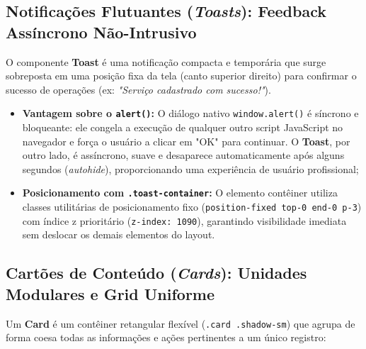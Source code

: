 \subsection{Notificações Flutuantes (\textit{Toasts}): Feedback Assíncrono Não-Intrusivo}
O componente \textbf{Toast} é uma notificação compacta e temporária que surge sobreposta em uma posição fixa da tela (canto superior direito) para confirmar o sucesso de operações (ex: \textit{"Serviço cadastrado com sucesso!"}).
\begin{itemize}
  \item \textbf{Vantagem sobre o \texttt{alert()}:} O diálogo nativo \texttt{window.alert()} é síncrono e bloqueante: ele congela a execução de qualquer outro script JavaScript no navegador e força o usuário a clicar em "OK" para continuar. O \textbf{Toast}, por outro lado, é assíncrono, suave e desaparece automaticamente após alguns segundos (\textit{autohide}), proporcionando uma experiência de usuário profissional;
  \item \textbf{Posicionamento com \texttt{.toast-container}:} O elemento contêiner utiliza classes utilitárias de posicionamento fixo (\texttt{position-fixed top-0 end-0 p-3}) com índice z prioritário (\texttt{z-index: 1090}), garantindo visibilidade imediata sem deslocar os demais elementos do layout.
\end{itemize}

\subsection{Cartões de Conteúdo (\textit{Cards}): Unidades Modulares e Grid Uniforme}
Um \textbf{Card} é um contêiner retangular flexível (\texttt{.card .shadow-sm}) que agrupa de forma coesa todas as informações e ações pertinentes a um único registro:

